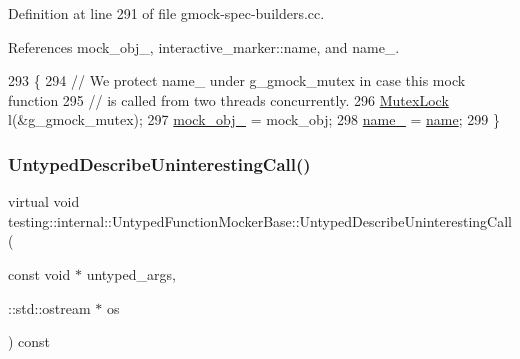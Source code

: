 Definition at line 291 of file gmock-\/spec-\/builders.\+cc.



References mock\+\_\+obj\+\_\+, interactive\+\_\+marker\+::name, and name\+\_\+.


\begin{DoxyCode}
293                                         \{
294   \textcolor{comment}{// We protect name\_ under g\_gmock\_mutex in case this mock function}
295   \textcolor{comment}{// is called from two threads concurrently.}
296   \hyperlink{namespacetesting_1_1internal_a08b187c6cc4e28400aadf9a32fccc8de}{MutexLock} l(&g\_gmock\_mutex);
297   \hyperlink{classtesting_1_1internal_1_1UntypedFunctionMockerBase_adf35c589969bb985668616031cb9ed56}{mock\_obj\_} = mock\_obj;
298   \hyperlink{classtesting_1_1internal_1_1UntypedFunctionMockerBase_a2d472077b9a8d3758caaec5770259f70}{name\_} = \hyperlink{namespaceinteractive__marker_a447655961b3d3ca3c5a2a9d3d769436d}{name};
299 \}
\end{DoxyCode}
\mbox{\label{classtesting_1_1internal_1_1UntypedFunctionMockerBase_a48a17fa75b744c2bfb19ee1f54d51759}} 
\subsubsection{\texorpdfstring{Untyped\+Describe\+Uninteresting\+Call()}{UntypedDescribeUninterestingCall()}}
{\footnotesize\ttfamily virtual void testing\+::internal\+::\+Untyped\+Function\+Mocker\+Base\+::\+Untyped\+Describe\+Uninteresting\+Call (\begin{DoxyParamCaption}\item[{const void $\ast$}]{untyped\+\_\+args,  }\item[{\+::std\+::ostream $\ast$}]{os }\end{DoxyParamCaption}) const\hspace{0.3cm}{\ttfamily [pure virtual]}}




